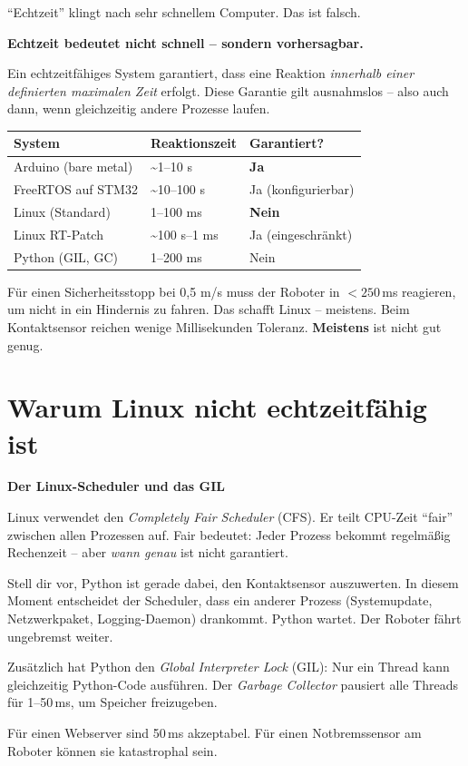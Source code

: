 \enquote{Echtzeit} klingt nach sehr schnellem Computer.
Das ist falsch.

\begin{wissenBox}
\textbf{Echtzeit bedeutet nicht schnell -- sondern vorhersagbar.}

Ein echtzeitfähiges System garantiert, dass eine Reaktion
\emph{innerhalb einer definierten maximalen Zeit} erfolgt.
Diese Garantie gilt ausnahmslos -- also auch dann, wenn
gleichzeitig andere Prozesse laufen.

\begin{tabular}{lll}
\toprule
System & Reaktionszeit & Garantiert? \\
\midrule
Arduino (bare metal) & \textasciitilde 1--10 \textmu{}s & \textbf{Ja} \\
FreeRTOS auf STM32   & \textasciitilde 10--100 \textmu{}s & Ja (konfigurierbar) \\
Linux (Standard)     & 1--100 ms & \textbf{Nein} \\
Linux RT-Patch       & \textasciitilde 100 \textmu{}s--1 ms & Ja (eingeschränkt) \\
Python (GIL, GC)     & 1--200 ms & Nein \\
\bottomrule
\end{tabular}

Für einen Sicherheitsstopp bei 0{,}5 m/s muss der Roboter in
$< 250$\,ms reagieren, um nicht in ein Hindernis zu fahren.
Das schafft Linux -- meistens. Beim Kontaktsensor reichen
wenige Millisekunden Toleranz. \textbf{Meistens} ist nicht gut genug.
\end{wissenBox}

\section{Warum Linux nicht echtzeitfähig ist}

\begin{haubeBox}
\textbf{Der Linux-Scheduler und das GIL}

Linux verwendet den \textit{Completely Fair Scheduler} (CFS).
Er teilt CPU-Zeit \enquote{fair} zwischen allen Prozessen auf.
Fair bedeutet: Jeder Prozess bekommt regelmäßig Rechenzeit --
aber \emph{wann genau} ist nicht garantiert.

Stell dir vor, Python ist gerade dabei, den Kontaktsensor
auszuwerten. In diesem Moment entscheidet der Scheduler,
dass ein anderer Prozess (Systemupdate, Netzwerkpaket,
Logging-Daemon) drankommt. Python wartet. Der Roboter fährt
ungebremst weiter.

Zusätzlich hat Python den \textit{Global Interpreter Lock}
(GIL): Nur ein Thread kann gleichzeitig Python-Code ausführen.
Der \textit{Garbage Collector} pausiert alle Threads für
1--50\,ms, um Speicher freizugeben.

Für einen Webserver sind 50\,ms akzeptabel.
Für einen Notbremssensor am Roboter können sie katastrophal sein.
\end{haubeBox}

